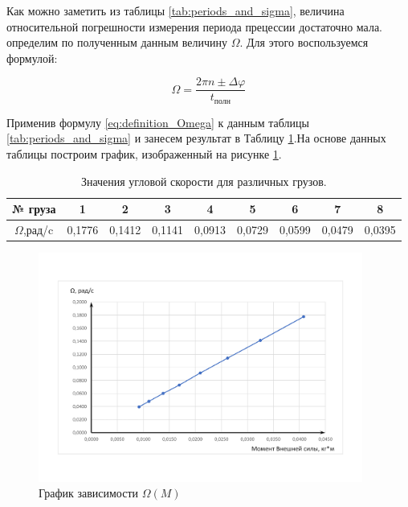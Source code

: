 \documentclass[12pt,a4paper]{article}
\begin{document}
Как можно заметить из таблицы \ref{tab:periods_and_sigma}, величина относительной погрешности измерения периода прецессии достаточно мала. определим по полученным данным величину $\Omega$. Для этого воспользуемся формулой:

\begin{equation}
	\Omega = \frac{2\pi n \pm \Delta\varphi}{t_{\text{полн}}}
	\label{eq:definition_Omega}
\end{equation} 
	
	Применив формулу \ref{eq:definition_Omega} к данным таблицы \ref{tab:periods_and_sigma} и занесем результат в Таблицу \ref{tab:first_experimental_Omega}.На основе данных таблицы построим график, изображенный на рисунке \ref{fig:graphic_Omega_moment}.
	
\begin{table}[h!]
	\centering
	\begin{tabular}{|c|c|c|c|c|c|c|c|c|}
		\hline
		№ груза & 1      & 2      & 3      & 4      & 5      & 6      & 7      & 8      \\ \hline
		$\Omega$,рад/c   & 0,1776 & 0,1412 & 0,1141 & 0,0913 & 0,0729 & 0,0599 & 0,0479 & 0,0395 \\ \hline
	\end{tabular}
	\caption{Значения угловой скорости для различных грузов.}
	\label{tab:first_experimental_Omega}
\end{table}

\begin{figure}[h!]
	\begin{center}
		\includegraphics[width = 0.95\textwidth]{Omega_moments_graphic}
		\caption{График зависимости $\Omega(M)$}
		\label{fig:graphic_Omega_moment}
	\end{center}
\end{figure}
\end{document}
